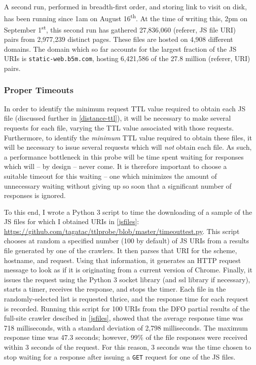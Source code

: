 A second run, performed in breadth-first order, and storing link to visit on disk, has been running since 1am on August 16\textsuperscript{th}.
At the time of writing this, 2pm on September 1\textsuperscript{st}, this second run has gathered 27,836,060 (referer, JS file URI) pairs from 2,977,239 distinct pages.
These files are hosted on 4,908 different domains.
The domain which so far accounts for the largest fraction of the JS URIs is \texttt{static-web.b5m.com}, hosting 6,421,586 of the 27.8 million (referer, URI) pairs.
\subsubsection{Proper Timeouts}
In order to identify the minimum request TTL value required to obtain each JS file (discussed further in \autoref{distance-ttl}), it will be necessary to make several requests for each file, varying the TTL value associated with those requests.
Furthermore, to identify the \textit{minimum} TTL value required to obtain these files, it will be necessary to issue several requests which will \textit{not} obtain each file.
As such, a performance bottleneck in this probe will be time spent waiting for responses which will -- by design -- never come.
It is therefore important to choose a suitable timeout for this waiting -- one which minimizes the amount of unnecessary waiting without giving up so soon that a significant number of responses is ignored.

To this end, I wrote a Python 3 script to time the downloading of a sample of the JS files for which I obtained URIs in \autoref{jsfiles}: \url{https://github.com/tagatac/ttlprobe/blob/master/timeouttest.py}.
This script chooses at random a specified number (100 by default) of JS URIs from a results file generated by one of the crawlers.
It then parses that URI for the scheme, hostname, and request.
Using that information, it generates an HTTP request message to look as if it is originating from a current version of Chrome.
Finally, it issues the request using the Python 3 socket library (and ssl library if necessary), starts a timer, receives the response, and stops the timer.
Each file in the randomly-selected list is requested thrice, and the response time for each request is recorded.
Running this script for 100 URIs from the DFO partial results of the full-site crawler descibed in \autoref{jsfiles}, showed that the average response time was 718 milliseconds, with a standard deviation of 2,798 milliseconds.
The maximum response time was 47.3 seconds; however, 99\% of the file responses were received within 3 seconds of the request.
For this reason, 3 seconds was the time chosen to stop waiting for a response after issuing a \texttt{GET} request for one of the JS files.
